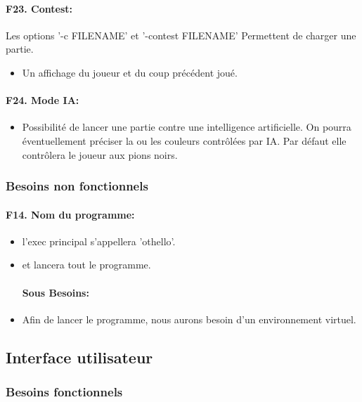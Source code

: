 \documentclass[a4paper,12pt]{article}
\begin{document}
\paragraph{F23. Contest:} Les options '-c FILENAME' et '-contest FILENAME' Permettent de charger une
partie.
\begin{itemize}
  \item Un affichage du joueur et du coup précédent joué.
\end{itemize}

\paragraph{F24. Mode IA:}
\begin{itemize}
  \item Possibilité de lancer une partie contre une intelligence artificielle. On
        pourra éventuellement préciser la ou les couleurs contrôlées par IA. Par défaut
        elle contrôlera le joueur aux pions noirs.
\end{itemize}

\subsubsection{Besoins non fonctionnels}

\paragraph{F14. Nom du programme:}
\begin{itemize}
  \item l'exec principal s'appellera 'othello'.
  \item et lancera tout le programme.
        \paragraph{Sous Besoins:}
  \item Afin de lancer le programme, nous aurons besoin d'un environnement virtuel.
\end{itemize}

\subsection{Interface utilisateur}

\subsubsection{Besoins fonctionnels}
\end{document}
